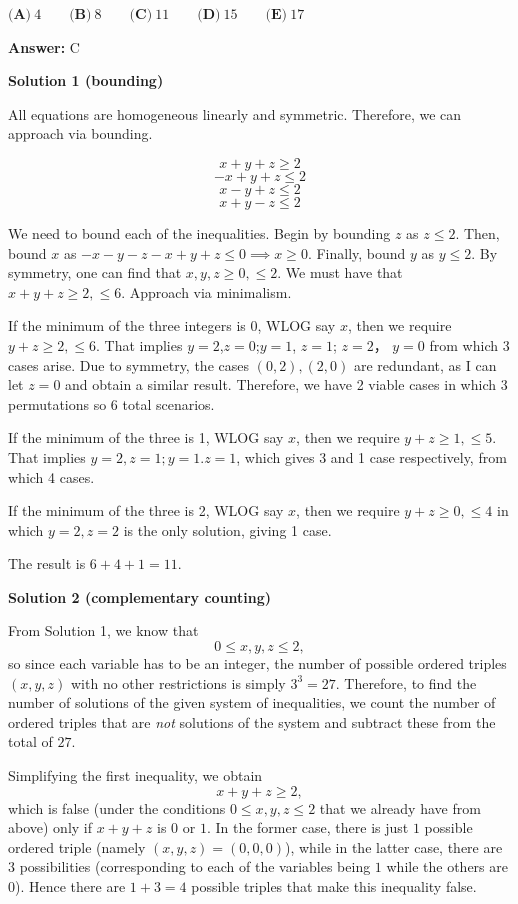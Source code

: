\begin{enumerate}
$\textbf{(A)}\ 4 \qquad \textbf{(B)}\ 8 \qquad \textbf{(C)}\ 11 \qquad \textbf{(D)}\ 15 \qquad \textbf{(E)}\ 17 \qquad$

 \textbf{Answer: }C



\textbf{Solution 1 (bounding)}

All equations are homogeneous linearly and symmetric. Therefore, we can approach via bounding.

 
 \[x+y+z \ge 2\]
 \[-x+y+z \le 2\]
 \[x-y+z \le 2\]
 \[x+y-z \le 2\]

 We need to bound each of the inequalities. Begin by bounding $z$ as $z \le 2$. Then, bound $x$ as $-x-y-z -x+y+z \le 0 \implies x \ge 0$. Finally, bound $y$ as $y \le 2$. By symmetry, one can find that $x,y,z \ge 0, \le 2$. We must have that $x+y+z \ge 2, \le 6$. Approach via minimalism.

 If the minimum of the three integers is 0, WLOG say $x$, then we require $y+z \ge 2, \le 6$. That implies $y = 2$,$z = 0$;$y=1$, $z=1$; $z = 2$， $y=0$ from which 3 cases arise. Due to symmetry, the cases $(0,2), (2,0)$ are redundant, as I can let $z = 0$ and obtain a similar result. Therefore, we have 2 viable cases in which 3 permutations so 6 total scenarios.

 If the minimum of the three is 1, WLOG say $x$, then we require $y+z \ge 1, \le 5$. That implies $y = 2, z = 1; y =1. z=1$, which gives 3 and 1 case respectively, from which 4 cases.

 If the minimum of the three is 2, WLOG say $x$, then we require $y+z \ge 0, \le 4$ in which $y=2, z=2$ is the only solution, giving 1 case.

 The result is $6+4+1 = \boxed{11}$.

 



\textbf{Solution 2 (complementary counting)}

From Solution 1, we know that
 \[0 \leq x, y, z \leq 2,\]so since each variable has to be an integer, the number of possible ordered triples $(x, y, z)$ with no other restrictions is simply $3^3 = 27$. Therefore, to find the number of solutions of the given system of inequalities, we count the number of ordered triples that are \textit{not} solutions of the system and subtract these from the total of $27$.

 
Simplifying the first inequality, we obtain
 \[x+y+z \geq 2,\]which is false (under the conditions $0 \leq x,y,z \leq 2$ that we already have from above) only if $x+y+z$ is $0$ or $1$. In the former case, there is just $1$ possible ordered triple (namely $(x,y,z) = (0,0,0)$), while in the latter case, there are $3$ possibilities (corresponding to each of the variables being $1$ while the others are $0$). Hence there are $1+3 = 4$ possible triples that make this inequality false.


\end{enumerate}
